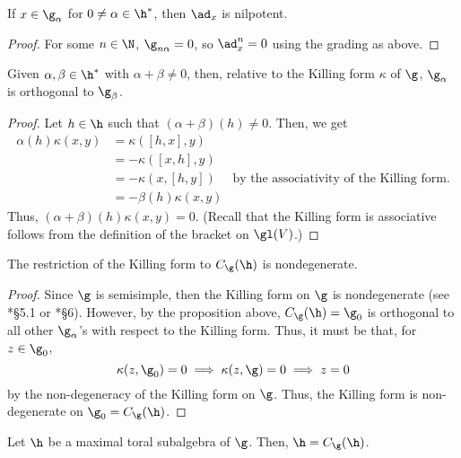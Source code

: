 \documentclass[11pt,leqno,oneside]{amsart}
\numberwithin{thm}{section}
\begin{document}
\begin{cor}
    If \(x \in \g_\alpha\) for \(0 \neq \alpha \in \h^*\), then \(\ad_x\) is
  nilpotent. 
\end{cor}
\begin{proof}
  For some \(n \in \N\), \(\g_{n \alpha} = 0\), so \(\ad_x^n = 0\)
  using the grading as above.
\end{proof}
\begin{prop}\label{killing-form-orthogonality}
  Given \(\alpha, \beta \in \h^*\) with \(\alpha+\beta \neq 0\), then,
  relative to the Killing form \(\kappa\) of \(\g\), \(\g_\alpha\) is
  orthogonal to \(\g_\beta\).
\end{prop}
\begin{proof}
  Let \(h \in \h\) such that \((\alpha+\beta)(h) \neq 0\). Then, we
  get
  \begin{align*}
    \alpha(h)\kappa(x,y) & = \kappa([h,x],y)\\
                         & = -\kappa([x,h],y)\\
                         & = -\kappa(x, [h,y]) & \text{by the
                                                 associativity of the
                                                 Killing form.}\\
                         & = -\beta(h)\kappa(x,y)
  \end{align*}
  Thus, \((\alpha+\beta)(h)\kappa(x,y) = 0\). (Recall that the Killing
  form is associative follows from the definition of the bracket on \(\gl(V)\).)
\end{proof}
\begin{cor}
  The restriction of the Killing form to \(C_\g(\h)\) is
  nondegenerate. 
\end{cor}
\begin{proof}
  Since \(\g\) is semisimple, then the Killing form on \(\g\) is
  nondegenerate (see \cite{humph}*{\S 5.1} or
  \cite{nilp-las}*{\S 6}). However, by the proposition above, \(C_\g(\h)
  = \g_0\) is orthogonal to all other \(\g_\alpha\)'s with respect to
  the Killing form. Thus, it must be that, for \(z \in \g_0\), \[
    \kappa(z,\g_0) = 0 \implies \kappa(z,\g) = 0 \implies z = 0
  \]
  by the non-degeneracy of the Killing form on \(\g\). Thus, the
  Killing form is non-degenerate on \(\g_0 = C_\g(\h)\).
\end{proof}
\begin{prop}
  Let \(\h\) be a maximal toral subalgebra of \(\g\). Then, \(\h = C_\g(\h)\).
\end{prop}
\end{document}
